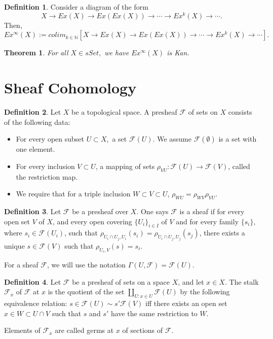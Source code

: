 \documentclass{article}
\newtheorem{theorem}{Theorem}[section]
\theoremstyle{definition}
\newtheorem{defn}{Definition}[section]
\newcommand{\N}{\mathbb{N}}
\begin{document}
\begin{defn}
Consider a diagram of the form 
\[X\rightarrow Ex(X)\rightarrow Ex(Ex(X))\rightarrow \cdots\rightarrow Ex^{k}(X)\rightarrow\cdots. \] Then,
\[Ex^{\infty}(X):= colim_{k\in\N}[X\rightarrow Ex(X)\rightarrow Ex(Ex(X))\rightarrow \cdots\rightarrow Ex^{k}(X)\rightarrow\cdots]. \] 
\end{defn}
\begin{theorem}
For all $X\in sSet,$ we have $Ex^{\infty}(X)$ is Kan. 
\end{theorem}

    \section{Sheaf Cohomology}
    \begin{defn}
    Let $X$ be a topological space. A presheaf $\mathcal{F}$ of sets on $X$ consists of the following data:
    \begin{itemize}
    \item For every open subset $U\subset X,$ a set $\mathcal{F}(U).$ We assume $\mathcal{F}(\emptyset)$ is a set with one element. 
    \item For every inclusion $V\subset U$, a mapping of sets $\rho_{VU}:\mathcal{F}(U)\rightarrow\mathcal{F}(V)$, called the restriction map.
    \item We require that for a triple inclusion $W\subset V\subset U$, $\rho_{WU}=\rho_{WV}\rho_{VU}.$
    \end{itemize}
    \end{defn}
    
    \begin{defn}
    Let $\mathcal{F}$ be a presheaf over $X$. One says $\mathcal{F}$ is a sheaf if for every open set $V$ of $X$, and every open covering $\{U_{i}\}_{i\in I}$ of $V$ and for every family $\{s_{i}\}$, where $s_{i}\in\mathcal{F}(U_{i})$, such that $\rho_{U_{i}\cap U_{j},U_{i}}(s_{i})=\rho_{U_{i}\cap U_{j},U_{j}}(s_{j})$, there exists a unique $s\in\mathcal{F}(V)$ such that $\rho_{U_{i},V}(s)=s_{i}.$
    \end{defn}
    
    For a sheaf $\mathcal{F}$, we will use the notation $\Gamma(U,\mathcal{F})=\mathcal{F}(U).$
    
    \begin{defn}
    Let $\mathcal{F}$ be a presheaf of sets on a space $X$, and let $x\in X.$ The stalk $\mathcal{F}_{x}$ of $\mathcal{F}$ at $x$ is the quotient of the set $\amalg_{U:x\in U}\mathcal{F}(U)$ by the following equivalence relation: $s\in\mathcal{F}(U)\sim s'\mathcal{F}(V)$ iff there exists an open set $x\in W\subset U\cap V$ such that $s$ and $s'$ have the same restriction to $W$.
    \end{defn}
    Elements of $\mathcal{F}_{x}$ are called germs at $x$ of sections of $\mathcal{F}$.
    
    
\end{document}
